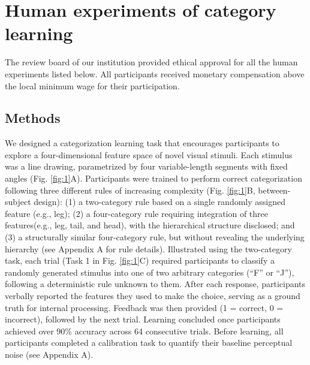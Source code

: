 \section{Human experiments of category learning}
\label{sec: experiment}

The review board of our institution provided ethical approval for all the human experiments listed below. All participants received monetary compensation above the local minimum wage for their participation.

\subsection{Methods}
We designed a categorization learning task that encourages participants to explore a four-dimensional feature space of novel visual stimuli. Each stimulus was a line drawing, parametrized by four variable-length segments with fixed angles (Fig. \ref{fig:1}A). Participants were trained to perform correct categorization following three different rules of increasing complexity (Fig. \ref{fig:1}B, between-subject design): (1) a two-category rule based on a single randomly assigned feature (e.g., leg); (2) a four-category rule requiring integration of three features(e.g., leg, tail, and head), with the hierarchical structure disclosed; and (3) a structurally similar four-category rule, but without revealing the underlying hierarchy (see Appendix A for rule details). Illustrated using the two-category task, each trial (Task 1 in Fig. \ref{fig:1}C) required participants to classify a randomly generated stimulus into one of two arbitrary categories (“F” or “J”), following a deterministic rule unknown to them. After each response, participants verbally reported the features they used to make the choice, serving as a ground truth for internal processing. Feedback was then provided (1 = correct, 0 = incorrect), followed by the next trial. Learning concluded once participants achieved over 90\% accuracy across 64 consecutive trials. Before learning, all participants completed a calibration task to quantify their baseline perceptual noise (see Appendix A).

